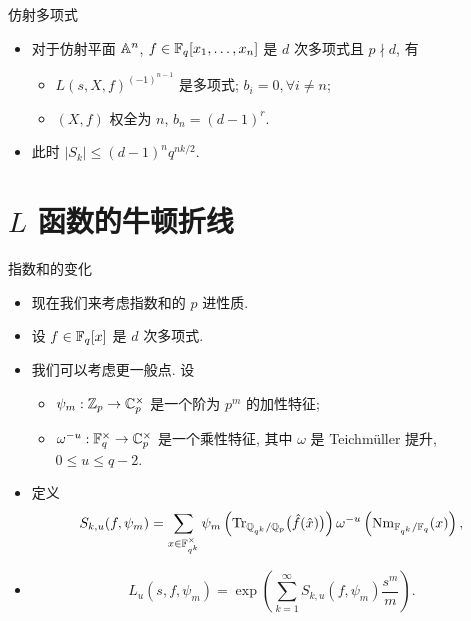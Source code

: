 \documentclass[aspectratio=169,handout]{ctexbeamer}
\begin{document}
\begin{frame}{仿射多项式}
	\begin{example}[leftupper=0pt][Serre1977]
		\begin{itemize}
			\item 对于仿射平面 ${\mathbb{A}}^n$, $f\in{\mathbb{F}}_q[x_1,\dots,x_n]$ 是 $d$ 次多项式且 $p\nmid d$, 有
			\begin{itemize}
				\item $L(s,X,f)^{(-1)^{n-1}}$ 是多项式; $b_i=0,\forall i\neq n$;
				\item $(X,f)$ 权全为 $n$, $b_n=(d-1)^r$.
			\end{itemize}
			\item 此时 $|S_k|\le (d-1)^nq^{nk/2}$.
		\end{itemize}
	\end{example}
\end{frame}


\section{$L$ 函数的牛顿折线}


\begin{frame}{指数和的变化}
	\begin{itemize}
		\item 现在我们来考虑指数和的 $p$ 进性质.
		\item 设 $f\in{\mathbb{F}}_q[x]$ 是 $d$ 次多项式.
		\item 我们可以考虑更一般点. 设
		\begin{itemize}
			\item $\psi_m:{\mathbb{Z}}_p\to{\mathbb{C}}_p^\times$ 是一个阶为 $p^m$ 的加性特征;
			\item $\omega^{-u}:{\mathbb{F}}_q^\times\to{\mathbb{C}}_p^\times$ 是一个乘性特征, 其中 $\omega$ 是 Teichm\"uller 提升, $0\le u\le q-2$.
		\end{itemize}
		\item 定义
		\[
			S_{k,u}(f,\psi_m)=\sum_{x\in{\mathbb{F}}_{q^k}^\times}\psi_m\left({\mathrm{Tr}}_{{\mathbb{Q}}_{q^k}/{\mathbb{Q}}_p}\bigl(\hat f(\hat x)\bigr)\right)\omega^{-u}\left({\mathrm{Nm}}_{{\mathbb{F}}_{q^k}/{\mathbb{F}}_q}(x)\right),
		\]
		\item 
		\[
			L_u(s,f,\psi_m)=\exp\left(\sum_{k=1}^\infty S_{k,u}(f,\psi_m)\frac{s^m}m\right).
		\]
	\end{itemize}
\end{frame}
\end{document}
